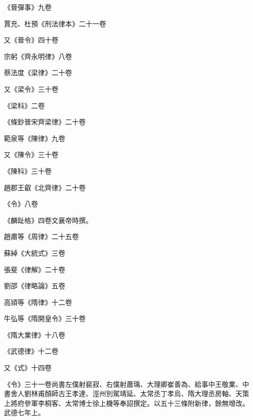 \begin{pinyinscope}
 《晉彈事》九卷



 賈充、杜預《刑法律本》二十一卷



 又《晉令》四十卷



 宗躬《齊永明律》八卷



 蔡法度《梁律》二十卷



 又《梁令》三十卷



 《梁科》二卷



 《條鈔晉宋齊梁律》二十卷



 範泉等《陳律》九卷



 又《陳令》三十卷



 《陳科》三十卷



 趙郡王叡《北齊律》二十卷



 《令》八卷



 《麟趾格》四卷文襄帝時撰。



 趙肅等《周律》二十五卷



 蘇綽《大統式》三卷



 張斐《律解》二十卷



 劉邵《律略論》五卷



 高熲等《隋律》十二卷



 牛弘等《隋開皇令》三十卷



 《隋大業律》十八卷



 《武德律》十二卷



 又《式》十四卷



 《令》三十一卷尚書左僕射裴寂、右僕射蕭瑀、大理卿崔善為、給事中王敬業、中書舍人劉林甫顏師古王孝達、涇州別駕靖延、太常丞丁孝烏、隋大理丞房軸、天策上將府參軍李桐客、太常博士徐上機等奉詔撰定。以五十三條附新律，餘無增改。武德七年上。




\end{pinyinscope}
